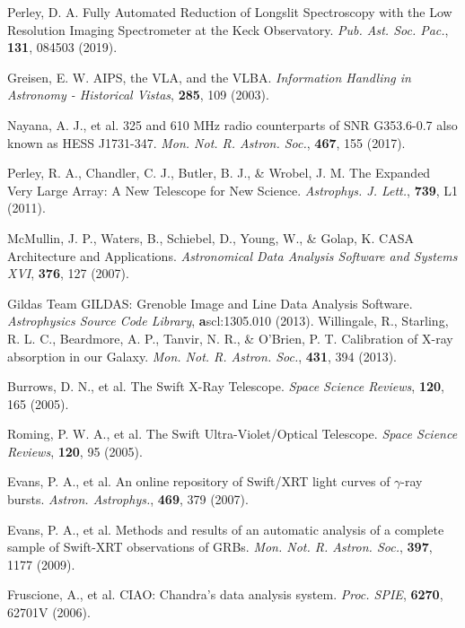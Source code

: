 \documentclass{nature_plusfigure}
\newcommand{\mn}{{Mon. Not. R. Astron. Soc.}}
\newcommand{\mnras}{\mn}
\newcommand{\apjl}{{Astrophys. J. Lett.}}
\newcommand{\aap}{{Astron. Astrophys.}}
\newcommand{\pasp}{{Pub. Ast. Soc. Pac.}}
\newcommand{\procspie}{Proc. SPIE}
\newcommand{\ssr}{Space Science Reviews}
\begin{document}
\begin{methods}
\begin{thebibliography}{10}
 Perley, D. A. Fully Automated Reduction of Longslit Spectroscopy with the Low Resolution Imaging Spectrometer at the Keck Observatory. \emph{\pasp}, \textbf{131}, 084503 (2019). 


  Greisen, E. W. AIPS, the VLA, and the VLBA. \emph{Information Handling in Astronomy - Historical Vistas}, \textbf{285}, 109 (2003). 

 Nayana, A. J., et al. 325 and 610 MHz radio counterparts of SNR G353.6-0.7 also known as HESS J1731-347. \emph{\mnras}, \textbf{467}, 155 (2017). 

 Perley, R. A., Chandler, C. J., Butler, B. J., \& Wrobel, J. M. The Expanded Very Large Array: A New Telescope for New Science. \emph{\apjl}, \textbf{739}, L1 (2011). 

 McMullin, J. P., Waters, B., Schiebel, D., Young, W., \& Golap, K. CASA Architecture and Applications. \emph{Astronomical Data Analysis Software and Systems XVI}, \textbf{376}, 127 (2007). 

 Gildas Team GILDAS: Grenoble Image and Line Data Analysis Software. \emph{Astrophysics Source Code Library}, \textbf ascl:1305.010 (2013). 
 Willingale, R., Starling, R. L. C., Beardmore, A. P., Tanvir, N. R., \& O'Brien, P. T. Calibration of X-ray absorption in our Galaxy. \emph{\mnras}, \textbf{431}, 394 (2013). 


 Burrows, D. N., et al. The Swift X-Ray Telescope. \emph{\ssr}, \textbf{120}, 165 (2005). 

 Roming, P. W. A., et al. The Swift Ultra-Violet/Optical Telescope. \emph{\ssr}, \textbf{120}, 95 (2005).

 Evans, P. A., et al. An online repository of Swift/XRT light curves of $\gamma$-ray bursts. \emph{\aap}, \textbf{469}, 379 (2007). 

 Evans, P. A., et al. Methods and results of an automatic analysis of a complete sample of Swift-XRT observations of GRBs. \emph{\mnras}, \textbf{397}, 1177 (2009). 

 Fruscione, A., et al. CIAO: Chandra's data analysis system. \emph{\procspie}, \textbf{6270}, 62701V (2006). 



\end{thebibliography}
\end{methods}
\end{document}
